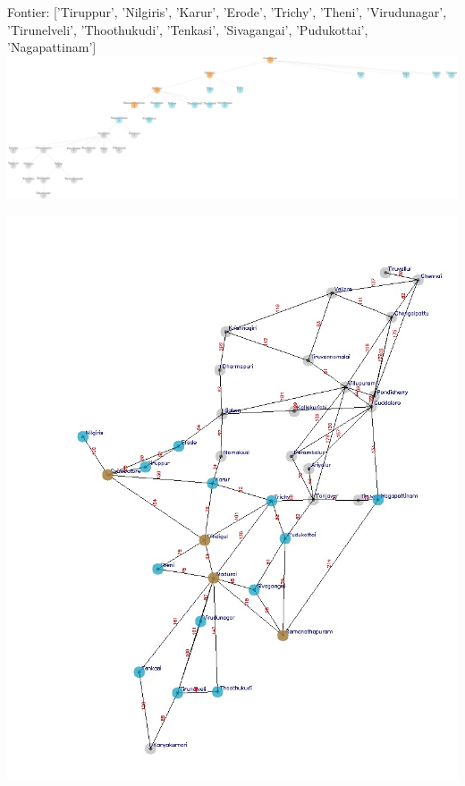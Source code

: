 \documentclass[xcolor=table]{beamer}
\begin{document}
\begin{frame}
  { \tiny Fontier: ['Tiruppur', 'Nilgiris', 'Karur', 'Erode', 'Trichy', 'Theni', 'Virudunagar', 'Tirunelveli', 'Thoothukudi', 'Tenkasi', 'Sivagangai', 'Pudukottai', 'Nagapattinam']}
  \includegraphics[width=1\textwidth]{../DFSNodes/6-1.png}
  \begin{center}
    \includegraphics[height=0.45\textheight]{../DFSoutput/tamilDFS4.jpg}
  \end{center}
\end{frame}
\end{document}
